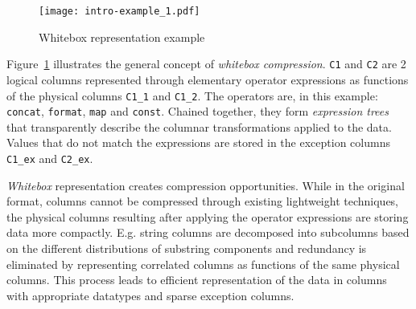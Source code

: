 \begin{figure}[h]
  \centering
  \texttt{[image: intro-example\_1.pdf]}
  \caption{Whitebox representation example}
  \label{fig:intro:whitebox:example}
\end{figure}

Figure~\ref{fig:intro:whitebox:example} illustrates the general concept of \textit{whitebox compression}. \verb|C1| and \verb|C2| are 2 logical columns represented through elementary operator expressions as functions of the physical columns \verb|C1_1| and \verb|C1_2|. The operators are, in this example: \verb|concat|, \verb|format|, \verb|map| and \verb|const|. Chained together, they form \textit{expression trees} that transparently describe the columnar transformations applied to the data. Values that do not match the expressions are stored in the exception columns \verb|C1_ex| and \verb|C2_ex|.

\textit{Whitebox} representation creates compression opportunities. While in the original format, columns cannot be compressed through existing lightweight techniques, the physical columns resulting after applying the operator expressions are storing data more compactly. E.g. string columns are decomposed into subcolumns based on the different distributions of substring components and redundancy is eliminated by representing correlated columns as functions of the same physical columns. This process leads to efficient representation of the data in columns with appropriate datatypes and sparse exception columns.



